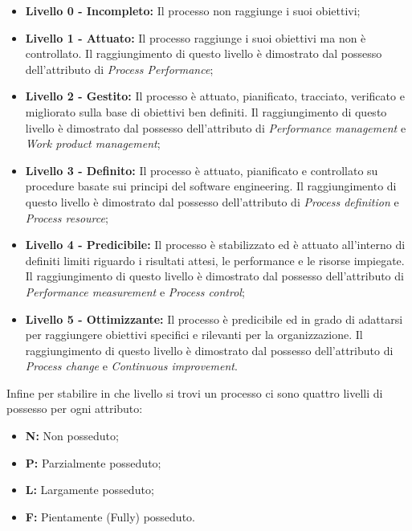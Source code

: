 \documentclass{scalatekids-article}
\begin{document}
\begin{itemize}
  \item{\textbf{Livello 0 - Incompleto:} Il processo non raggiunge i suoi obiettivi;}
  \item{\textbf{Livello 1 - Attuato:} Il processo raggiunge i suoi obiettivi ma non è controllato. Il raggiungimento di questo livello è dimostrato dal possesso dell'attributo di \textit{Process Performance};}
  \item{\textbf{Livello 2 - Gestito:} Il processo è attuato, pianificato, tracciato, verificato e migliorato sulla base di obiettivi ben definiti. Il raggiungimento di questo livello è dimostrato dal possesso dell'attributo di \textit{Performance management} e \textit{Work product management};}
  \item{\textbf{Livello 3 - Definito:} Il processo è attuato, pianificato e controllato su procedure basate sui principi del software engineering. Il raggiungimento di questo livello è dimostrato dal possesso dell'attributo di \textit{Process definition} e \textit{Process resource};}
  \item{\textbf{Livello 4 - Predicibile:} Il processo è stabilizzato ed è attuato all’interno di definiti limiti riguardo i risultati attesi, le performance e le risorse impiegate. Il raggiungimento di questo livello è dimostrato dal possesso dell'attributo di \textit{Performance measurement} e \textit{Process control};}
  \item{\textbf{Livello 5 - Ottimizzante:} Il processo è predicibile ed in grado di adattarsi per raggiungere obiettivi specifici e rilevanti per la organizzazione. Il raggiungimento di questo livello è dimostrato dal possesso dell'attributo di \textit{Process change} e \textit{Continuous improvement}.}
\end{itemize}
Infine per stabilire in che livello si trovi un processo ci sono quattro livelli di possesso per ogni attributo:
\begin{itemize}
  \item{\textbf{N:} Non posseduto;}
  \item{\textbf{P:} Parzialmente posseduto;}
  \item{\textbf{L:} Largamente posseduto;}
  \item{\textbf{F:} Pientamente (Fully) posseduto.}
\end{itemize}
\end{document}
